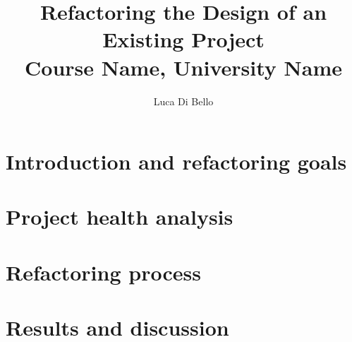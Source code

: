 \documentclass[a4paper, 11pt]{article}
\title{Refactoring the Design of an Existing Project \\\large Course Name, University Name}
\author{Luca Di Bello}
\date{\displaydate{today}}
\begin{document}
\maketitle

\section{Introduction and refactoring goals}


\section{Project health analysis}
\label{sec:project_health_analysis}


\section{Refactoring process}
\label{sec:refactoring}


\section{Results and discussion}
\label{sec:results_conclusions}


\printbibliography
\end{document}

